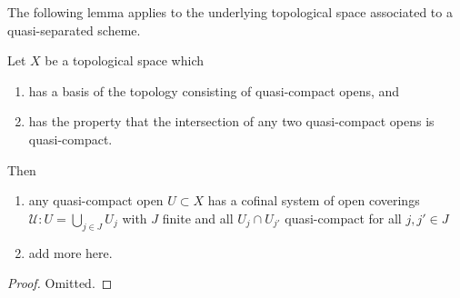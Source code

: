 \noindent
The following lemma applies to the underlying topological space
associated to a quasi-separated scheme.

\begin{lemma}
\label{lemma-topology-quasi-separated-scheme}
Let $X$ be a topological space which
\begin{enumerate}
\item has a basis of the topology consisting of quasi-compact opens, and
\item has the property that the intersection of any two quasi-compact
opens is quasi-compact.
\end{enumerate}
Then
\begin{enumerate}
\item any quasi-compact open $U \subset X$
has a cofinal system of open coverings
$\mathcal{U} : U = \bigcup_{j\in J} U_j$ with $J$ finite and
all $U_j \cap U_{j'}$ quasi-compact for all $j, j' \in J$
\item add more here.
\end{enumerate}
\end{lemma}

\begin{proof}
Omitted.
\end{proof}

























